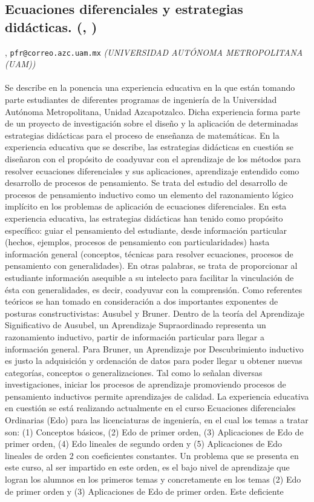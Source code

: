 \subsection{\sffamily Ecuaciones diferenciales y estrategias didácticas. {\footnotesize (, )}} \label{reg-1610} 
, {\tt pfr@correo.azc.uam.mx}  {\slshape (UNIVERSIDAD AUTÓNOMA METROPOLITANA (UAM))}\\
\\
\noindent Se describe en la ponencia una experiencia educativa en la que están tomando parte estudiantes de diferentes programas de ingeniería de la Universidad Autónoma Metropolitana, Unidad Azcapotzalco. Dicha experiencia forma parte de un proyecto de investigación sobre el diseño y la aplicación de determinadas estrategias didácticas para el proceso de enseñanza de matemáticas. En la experiencia educativa que se describe, las estrategias didácticas en cuestión se diseñaron con el propósito de coadyuvar con el aprendizaje de los métodos para resolver ecuaciones diferenciales y sus aplicaciones, aprendizaje entendido como desarrollo de procesos de pensamiento. Se trata del estudio del desarrollo de procesos de pensamiento inductivo como un elemento del razonamiento lógico implícito en los problemas de aplicación de ecuaciones diferenciales. En esta experiencia educativa, las estrategias didácticas han tenido como propósito específico: guiar el pensamiento del estudiante, desde información particular (hechos, ejemplos, procesos de pensamiento con particularidades) hasta información general (conceptos, técnicas para resolver ecuaciones, procesos de pensamiento con generalidades). En otras palabras, se trata de proporcionar al estudiante información asequible a su intelecto para facilitar la vinculación de ésta con generalidades, es decir, coadyuvar con la comprensión. Como referentes teóricos se han tomado en consideración a dos importantes exponentes de posturas constructivistas: Ausubel y Bruner. Dentro de la teoría del Aprendizaje Significativo de Ausubel, un Aprendizaje Supraordinado representa un razonamiento inductivo, partir de información particular para llegar a información general. Para Bruner, un Aprendizaje por Descubrimiento inductivo es justo la adquisición y ordenación de datos para poder llegar u obtener nuevas categorías, conceptos o generalizaciones. Tal como lo señalan diversas investigaciones, iniciar los procesos de aprendizaje promoviendo procesos de pensamiento inductivos permite aprendizajes de calidad. La experiencia educativa en cuestión se está realizando actualmente en el curso Ecuaciones diferenciales Ordinarias (Edo) para las licenciaturas de ingeniería, en el cual los temas a tratar son: (1) Conceptos básicos, (2) Edo de primer orden, (3) Aplicaciones de Edo de primer orden, (4) Edo lineales de segundo orden y (5) Aplicaciones de Edo lineales de orden 2 con coeficientes constantes. Un problema que se presenta en este curso, al ser impartido en este orden, es el bajo nivel de aprendizaje que logran los alumnos en los primeros temas y concretamente en los temas (2) Edo de primer orden y (3) Aplicaciones de Edo de primer orden. Este deficiente 